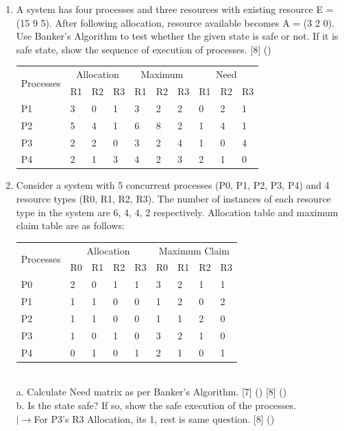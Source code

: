 \documentclass[12pt]{article}
\newcommand{\lb}{\\$\left|\rightarrow\right.$}
\begin{document}
\begin{enumerate}
			\item A system has four processes and three resources with existing resource E = (15 9 5). After following allocation, resource available becomes A = (3 2 0). Use Banker's Algorithm to test whether the given state is safe or not. If it is safe state, show the sequence of execution of processes. \hfill [8] ()\\
			\begin{tabular}{|p{17mm}|p{7mm}|p{7mm}|p{7mm}|p{7mm}|p{7mm}|p{7mm}|p{7mm}|p{7mm}|p{7mm}|}
				\hline
				\multirow{2}{*}{Processes} & \multicolumn{3}{|c|}{Allocation} & \multicolumn{3}{|c|}{Maximum} & \multicolumn{3}{|c|}{Need} \\ \cline{2-10}
				& R1 & R2 & R3 & R1 & R2 & R3 & R1 & R2 & R3 \\ \hline
				P1 & 3 & 0 & 1 & 3 & 2 & 2 & 0 & 2 & 1 \\ \hline
				P2 & 5 & 4 & 1 & 6 & 8 & 2 & 1 & 4 & 1 \\ \hline
				P3 & 2 & 2 & 0 & 3 & 2 & 4 & 1 & 0 & 4 \\ \hline
				P4 & 2 & 1 & 3 & 4 & 2 & 3 & 2 & 1 & 0 \\ \hline
			\end{tabular}

			\item Consider a system with 5 concurrent processes (P0, P1, P2, P3, P4) and 4 resource types (R0, R1, R2, R3). The number of instances of each resource type in the system are 6, 4, 4, 2 respectively. Allocation table and maximum claim table are as follows: \\
			\begin{tabular}{|p{17mm}|p{7mm}|p{7mm}|p{7mm}|p{7mm}||p{7mm}|p{7mm}|p{7mm}|p{7mm}|}
				\hline
				\multirow{2}{*}{Processes} & \multicolumn{4}{|c||}{Allocation} & \multicolumn{4}{|c|}{Maximum Claim} \\ \cline{2-9}
				& R0 & R1 & R2 & R3 & R0 & R1 & R2 & R3 \\ \hline
				P0 & 2 & 0 & 1 & 1 & 3 & 2 & 1 & 1 \\ \hline
				P1 & 1 & 1 & 0 & 0 & 1 & 2 & 0 & 2 \\ \hline
				P2 & 1 & 1 & 0 & 0 & 1 & 1 & 2 & 0 \\ \hline
				P3 & 1 & 0 & 1 & 0 & 3 & 2 & 1 & 0 \\ \hline
				P4 & 0 & 1 & 0 & 1 & 2 & 1 & 0 & 1 \\ \hline
			\end{tabular} \\
			a. Calculate Need matrix as per Banker's Algorithm. \hfill [7] () [8] ()\\
			b. Is the state safe? If so, show the safe execution of the processes.
			\lb For P3's R3 Allocation, its 1, rest is same question. \hfill [8] ()


\end{enumerate}
\end{document}
